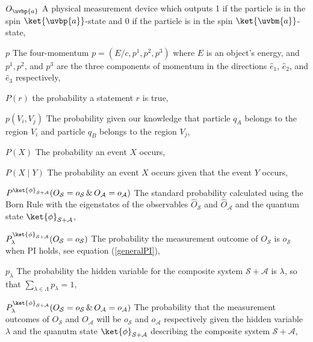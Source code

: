 \begin{thenomenclature}
      \item [{$O_{\uvbp{a}}$}]\begingroup A physical measurement device which outputs 1 if the particle is in the spin $\ket{\uvbp{a}}$-state and 0 if the particle is in the spin $\ket{\uvbm{a}}$-state, \nomrefpage{}
      \item [{$p$}]\begingroup The four-momentum $p=(E/c, p^1, p^2, p^3)$ where $E$ is an object's energy, and $p^1, p^2$, and $p^3$    are the three components of momentum in the directions $\hat{e}_1$, $\hat{e}_2$, and $\hat{e}_3$ respectively, \nomrefpage{}
      \item [{$P(r)$}]\begingroup the probability a statement $r$ is true, \nomrefpage{}
      \item [{$p(V_i, V_j)$}]\begingroup The probability given our knowledge that particle  $q_A$ belongs to the region $V_i$ and particle $q_B$ belongs to the region $V_j$, \nomrefpage{}
      \item [{$P(X)$}]\begingroup The probability an event $X$ occurs, \nomrefpage{}
      \item [{$P(X\mid Y)$}]\begingroup The probability an event $X$ occurs given that the event $Y$ occurs, \nomrefpage{}
      \item [{$P^{\ket{\phi}_{\mathcal{S}+\mathcal{A}}}(O_\mathcal{S}=o_\mathcal{S}\, \& \,O_\mathcal{A}=o_\mathcal{A})$}]\begingroup The standard probability calculated using the Born Rule with the eigenstates of the observables $\hat{O}_\mathcal{S}$ and $\hat{O}_\mathcal{A}$ and the quantum state $\ket{\phi}_{\mathcal{S}+\mathcal{A}}$, \nomrefpage{}
      \item [{$P^{\ket{\phi}_{\mathcal{S}+\mathcal{A}}}_{\lambda}(O_\mathcal{S}=o_\mathcal{S})$}]\begingroup The probability the measurement outcome of $O_\mathcal{S}$ is $o_\mathcal{S}$ when PI holds, see equation (\ref{generalPI}), \nomrefpage{}
      \item [{$p_\lambda$}]\begingroup The probability the hidden variable for the composite system $\mathcal{S}+\mathcal{A}$ is $\lambda$, so that $\sum_{\lambda\in\Lambda} p_\lambda = 1$, \nomrefpage{}
      \item [{$P_\lambda^{\ket{\phi}_{\mathcal{S}+\mathcal{A}}}(O_\mathcal{S}=o_\mathcal{S}\, \& \, O_\mathcal{A}=o_\mathcal{A})$}]\begingroup The probability that the measurement outcomes of $O_{\mathcal{S}}$ and $O_{\mathcal{A}}$ will be $o_{\mathcal{S}}$  and $o_{\mathcal{A}}$ respectively given the hidden variable $\lambda$ and the quanutm state $\ket{\phi}_{\mathcal{S}+\mathcal{A}}$ describing the composite system $\mathcal{S}+\mathcal{A}$, \nomrefpage{}

\end{thenomenclature}
